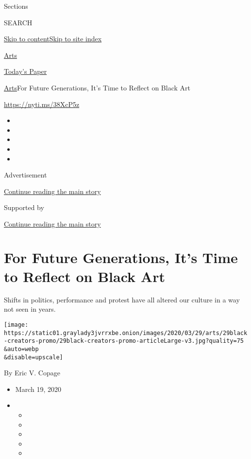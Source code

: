 Sections

SEARCH

\protect\hyperlink{site-content}{Skip to
content}\protect\hyperlink{site-index}{Skip to site index}

\href{https://www.nytimes3xbfgragh.onion/section/arts}{Arts}

\href{https://myaccount.nytimes3xbfgragh.onion/auth/login?response_type=cookie\&client_id=vi}{}

\href{https://www.nytimes3xbfgragh.onion/section/todayspaper}{Today's
Paper}

\href{/section/arts}{Arts}\textbar{}For Future Generations, It's Time to
Reflect on Black Art

\url{https://nyti.ms/38XcP5z}

\begin{itemize}
\item
\item
\item
\item
\item
\end{itemize}

Advertisement

\protect\hyperlink{after-top}{Continue reading the main story}

Supported by

\protect\hyperlink{after-sponsor}{Continue reading the main story}

\hypertarget{for-future-generations-its-time-to-reflect-on-black-art}{%
\section{For Future Generations, It's Time to Reflect on Black
Art}\label{for-future-generations-its-time-to-reflect-on-black-art}}

Shifts in politics, performance and protest have all altered our culture
in a way not seen in years.

\texttt{[image: https://static01.graylady3jvrrxbe.onion/images/2020/03/29/arts/29black-creators-promo/29black-creators-promo-articleLarge-v3.jpg?quality=75\\\&auto=webp\\\&disable=upscale]}

By Eric V. Copage

\begin{itemize}
\item
  March 19, 2020
\item
  \begin{itemize}
  \item
  \item
  \item
  \item
  \item
  \end{itemize}
\end{itemize}

